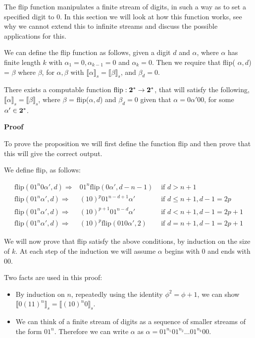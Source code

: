 \documentclass{cs4rep}
\begin{document}
The flip function manipulates a finite stream of digits, in such a way
as to set a specified digit to 0. In this section we will look at how
this function works, see why we cannot extend this to infinite streams
and discuss the possible applications for this.

We can define the flip function as follows, given a digit $d$ and
$\alpha$, where $\alpha$ has finite length $k$ with $\alpha_{1}=0,
\alpha_{k-1}=0$ and $\alpha_{k}=0$. Then we require that flip( $
\alpha, d $) = $ \beta $ where $ \beta $, for $\alpha , \beta$ with
$ \llbracket \alpha \rrbracket_{s} = \llbracket \beta \rrbracket_{s}
$, and $\beta_{d}=0$.

\begin{myprop}
  There exists a computable function $ \mbox{flip} : {\bf 2^{*}
    \rightarrow 2^{*}} $, that will satisfy the following, $
  \llbracket \alpha \rrbracket_{s} = \llbracket \beta \rrbracket_{s}
  $, where $ \beta $ = flip($ \alpha, d $) and $ \beta_{d}=0 $ given
  that $ \alpha = 0\alpha' 00 $, for some $ \alpha' \in {\bf 2}^{*} $.
\end{myprop}

{\bf Proof}

To prove the proposition we will first define the function flip and
then prove that this will give the correct output.

We define flip, as follows:

\begin{eqnarray}
\mbox{flip}(01^{n}0\alpha', d) \Rightarrow & 01^{n} \mbox{flip}(0\alpha', d-n-1) & \mbox{ if } d > n+1 \label{eq:flip1} \\
\mbox{flip}(01^{n}\alpha',d) \Rightarrow & (10)^{p}01^{n-d+1}\alpha' & \mbox{ if } d \leq n+1, d-1 = 2p \label{eq:flip2} \\
\mbox{flip}(01^{n}\alpha',d) \Rightarrow & (10)^{p+1}01^{n-d}\alpha' & \mbox{ if } d<n+1, d-1 = 2p+1 \label{eq:flip3} \\
\mbox{flip}(01^{n}\alpha',d) \Rightarrow & (10)^{p}\mbox{flip}(010\alpha', 2) & \mbox{ if } d=n+1, d-1=2p+1 \label{eq:flip4} 
\end{eqnarray}

We will now prove that flip satisfy the above conditions, by induction
on the size of $k$. At each step of the induction we will assume
$\alpha$ begins with 0 and ends with 00.

Two facts are used in this proof:
\begin{itemize}
\item By induction on $n$, repeatedly using the identity $\phi^{2} = \phi +1
$, we can show $\llbracket 0(11)^{n} \rrbracket_{s} = \llbracket
(10)^{n}0 \rrbracket_{s} $.
\item We can think of a finite stream of digits as a sequence of
  smaller streams of the form $01^{n}$. Therefore we can write
  $\alpha$ as $\alpha = 01^{n_1}01^{n_2}\ldots 01^{n_k} 00$.
\end{itemize}
\end{document}
